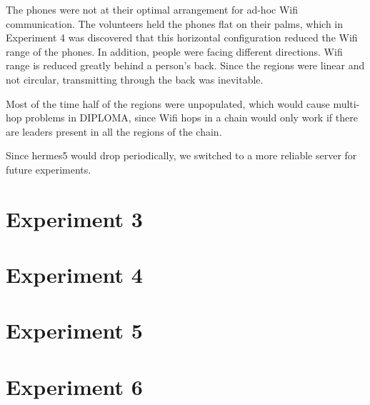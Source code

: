 The phones were not at their optimal arrangement for ad-hoc Wifi communication. The volunteers held the phones flat on their palms, which in Experiment 4 was discovered that this horizontal configuration reduced the Wifi range of the phones. In addition, people were facing different directions. Wifi range is reduced greatly behind a person's back. Since the regions were linear and not circular, transmitting through the back was inevitable.

Most of the time half of the regions were unpopulated, which would cause multi-hop problems in DIPLOMA, since Wifi hops in a chain would only work if there are leaders present in all the regions of the chain.

Since hermes5 would drop periodically, we switched to a more reliable server for future experiments.

\section{Experiment 3}
\section{Experiment 4}
\section{Experiment 5}
\section{Experiment 6}
